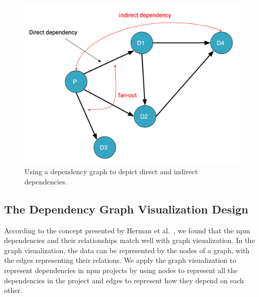 \documentclass[conference]{IEEEtran}
\begin{document}
	
	
	\begin{figure}
		\centering
		\includegraphics[width=0.9\linewidth]{Figures/Viz-concept-2}
		\caption{Using a dependency graph to depict direct and indirect dependencies.}
		\label{fig:viz-concept-2}
	\end{figure}
	
	\subsection{The Dependency Graph Visualization Design}
	According to the concept presented by Herman et al.~\cite{Herman2000}, we found that the npm dependencies and their relationships match well with graph visualization. In the graph visualization, the data can be represented by the nodes of a graph, with the edges representing their relations. We apply the graph visualization to represent dependencies in npm projects by using nodes to represent all the dependencies in the project and edges to represent how they depend on each other.
	
\end{document}
